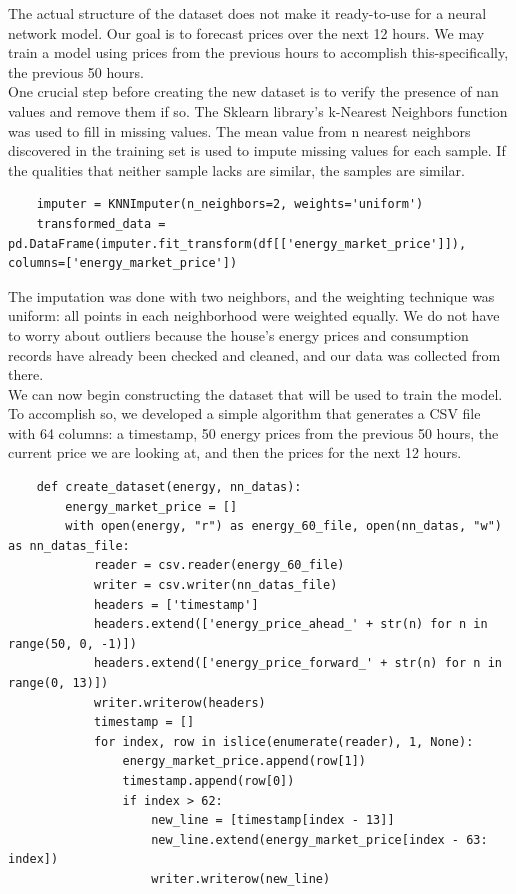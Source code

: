 The actual structure of the dataset does not make it ready-to-use for a neural network model. Our goal is to forecast prices over the next 12 hours. We may train a model using prices from the previous hours to accomplish this-specifically, the previous 50 hours. \\
One crucial step before creating the new dataset is to verify the presence of nan values and remove them if so. The Sklearn library's k-Nearest Neighbors function was used to fill in missing values. The mean value from n nearest neighbors discovered in the training set is used to impute missing values for each sample. If the qualities that neither sample lacks are similar, the samples are similar.
\begin{verbatim}
    imputer = KNNImputer(n_neighbors=2, weights='uniform')
    transformed_data = pd.DataFrame(imputer.fit_transform(df[['energy_market_price']]), columns=['energy_market_price'])
\end{verbatim}
The imputation was done with two neighbors, and the weighting technique was uniform: all points in each neighborhood were weighted equally. We do not have to worry about outliers because the house's energy prices and consumption records have already been checked and cleaned, and our data was collected from there. \\
We can now begin constructing the dataset that will be used to train the model. To accomplish so, we developed a simple algorithm that generates a CSV file with 64 columns: a timestamp, 50 energy prices from the previous 50 hours, the current price we are looking at, and then the prices for the next 12 hours.
\begin{verbatim}
    def create_dataset(energy, nn_datas):
        energy_market_price = []
        with open(energy, "r") as energy_60_file, open(nn_datas, "w") as nn_datas_file:
            reader = csv.reader(energy_60_file)
            writer = csv.writer(nn_datas_file)
            headers = ['timestamp']
            headers.extend(['energy_price_ahead_' + str(n) for n in range(50, 0, -1)])
            headers.extend(['energy_price_forward_' + str(n) for n in range(0, 13)])
            writer.writerow(headers)
            timestamp = []
            for index, row in islice(enumerate(reader), 1, None):
                energy_market_price.append(row[1])
                timestamp.append(row[0])
                if index > 62:
                    new_line = [timestamp[index - 13]]
                    new_line.extend(energy_market_price[index - 63: index])
                    writer.writerow(new_line)
\end{verbatim}

